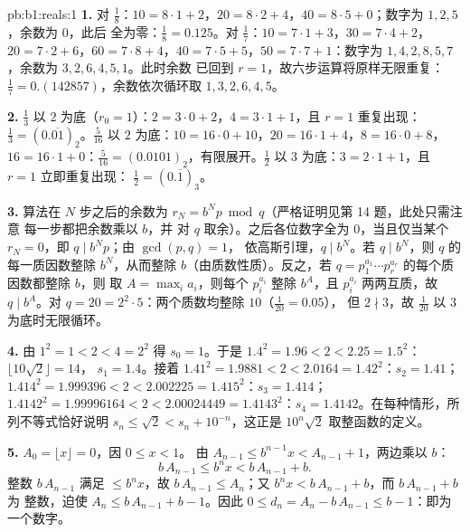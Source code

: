 \begin{solution}{pb:b1:reals:1}
\textbf{1.} 对 $\frac 18$：$10 = 8 \cdot 1 + 2$，$20 = 8 \cdot 2
+ 4$，$40 = 8 \cdot 5 + 0$；数字为 $1, 2, 5$，余数为 $0$，此后
全为零：$\frac 18 = 0.125$。对 $\frac 17$：$10 = 7 \cdot 1 +
3$，$30 = 7 \cdot 4 + 2$，$20 = 7 \cdot 2 + 6$，$60 = 7 \cdot 8 +
4$，$40 = 7 \cdot 5 + 5$，$50 = 7 \cdot 7 + 1$：数字为 $1, 4, 2,
8, 5, 7$，余数为 $3, 2, 6, 4, 5, 1$。此时余数
已回到 $r = 1$，故六步运算将原样无限重复：
$\frac 17 = 0.(142857)$，余数依次循环取 $1, 3, 2, 6,
4, 5$。

\textbf{2.} $\frac 13$ 以 $2$ 为底（$r_0 = 1$）：$2 = 3 \cdot 0 +
2$，$4 = 3 \cdot 1 + 1$，且 $r = 1$ 重复出现：$\frac 13 =
(0.\overline{01})_2$。$\frac{5}{16}$ 以 $2$ 为底：$10 = 16 \cdot
0 + 10$，$20 = 16 \cdot 1 + 4$，$8 = 16 \cdot 0 + 8$，$16 = 16
\cdot 1 + 0$：$\frac{5}{16} = (0.0101)_2$，有限展开。$\frac 12$
以 $3$ 为底：$3 = 2 \cdot 1 + 1$，且 $r = 1$ 立即重复出现：
$\frac 12 = (0.\overline{1})_3$。

\textbf{3.} 算法在 $N$ 步之后的余数为 $r_N =
b^N p \bmod q$（严格证明见第 14 题，此处只需注意
每一步都把余数乘以 $b$，并
对 $q$ 取余）。之后各位数字全为 $0$，当且仅当某个
$r_N = 0$，即 $q \mid b^N p$；由 $\gcd(p, q) = 1$，
依高斯引理，$q \mid b^N$。若 $q \mid b^N$，则
$q$ 的每一质因数整除 $b^N$，从而整除 $b$（由质数性质）。反之，若
$q = p_1^{a_1} \cdots p_r^{a_r}$ 的每个质因数都整除 $b$，则
取 $A = \max_i a_i$，则每个 $p_i^{a_i}$ 整除 $b^A$，且
$p_i^{a_i}$ 两两互质，故 $q \mid b^A$。对 $q = 20 =
2^2 \cdot 5$：两个质数均整除 $10$（$\frac{1}{20} = 0.05$），
但 $2 \nmid 3$，故 $\frac{1}{20}$ 以 $3$ 为底时无限循环。

\textbf{4.} 由 $1^2 = 1 < 2 < 4 = 2^2$ 得 $s_0 = 1$。于是 $1.4^2
= 1.96 < 2 < 2.25 = 1.5^2$：$\lfloor 10\sqrt 2 \rfloor = 14$，
$s_1 = 1.4$。接着 $1.41^2 = 1.9881 < 2 < 2.0164 = 1.42^2$：$s_2 =
1.41$；$1.414^2 = 1.999396 < 2 < 2.002225 = 1.415^2$：$s_3 =
1.414$；$1.4142^2 = 1.99996164 < 2 < 2.00024449 = 1.4143^2$：$s_4
= 1.4142$。在每种情形，所列不等式恰好说明
$s_n \leq \sqrt 2 < s_n + 10^{-n}$，这正是
$10^n \sqrt 2$ 取整函数的定义。

\textbf{5.} $A_0 = \lfloor x \rfloor = 0$，因 $0 \leq x < 1$。
由 $A_{n-1} \leq b^{n-1} x < A_{n-1} + 1$，两边乘以 $b$：
\[
b\,A_{n-1} \leq b^n x < b\,A_{n-1} + b .
\]
整数 $b\,A_{n-1}$ 满足 $\leq b^n x$，故 $b\,A_{n-1} \leq
A_n$；又 $b^n x < b\,A_{n-1} + b$，而 $b\,A_{n-1} + b$ 为
整数，迫使 $A_n \leq b\,A_{n-1} + b - 1$。因此 $0 \leq d_n =
A_n - b\,A_{n-1} \leq b - 1$：即为一个数字。


\end{solution}
